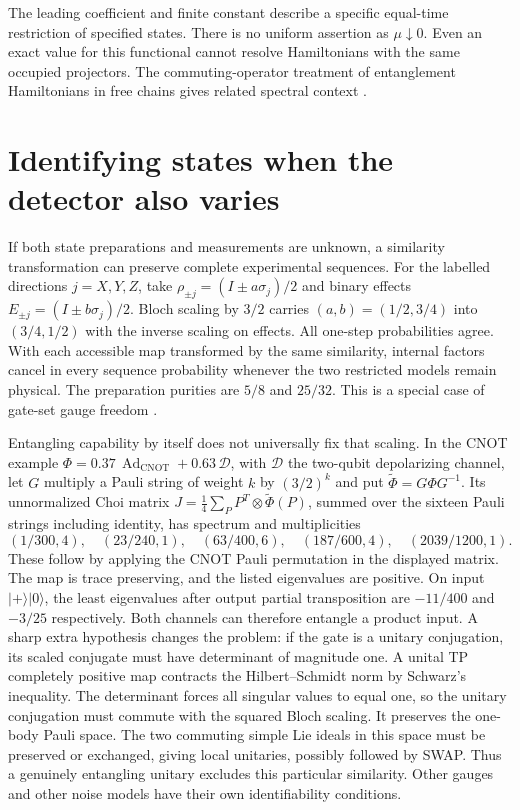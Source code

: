 \documentclass[11pt,letterpaper]{article}
\begin{document}
The leading coefficient and finite constant describe a specific equal-time restriction of specified states. There is no uniform assertion as $\mu\downarrow0$. Even an exact value for this functional cannot resolve Hamiltonians with the same occupied projectors. The commuting-operator treatment of entanglement Hamiltonians in free chains gives related spectral context \cite{eisler}.

\section{Identifying states when the detector also varies}\label{sec:readout}

If both state preparations and measurements are unknown, a similarity transformation can preserve complete experimental sequences. For the labelled directions $j=X,Y,Z$, take $\rho_{\pm j}=(I\pm a\sigma_j)/2$ and binary effects $E_{\pm j}=(I\pm b\sigma_j)/2$. Bloch scaling by $3/2$ carries $(a,b)=(1/2,3/4)$ into $(3/4,1/2)$ with the inverse scaling on effects. All one-step probabilities agree. With each accessible map transformed by the same similarity, internal factors cancel in every sequence probability whenever the two restricted models remain physical. The preparation purities are $5/8$ and $25/32$. This is a special case of gate-set gauge freedom \cite{gst}.

Entangling capability by itself does not universally fix that scaling. In the CNOT example $\Phi=0.37\,\operatorname{Ad}_{\mathrm{CNOT}}+0.63\,\mathcal D$, with $\mathcal D$ the two-qubit depolarizing channel, let $G$ multiply a Pauli string of weight $k$ by $(3/2)^k$ and put $\widetilde\Phi=G\Phi G^{-1}$. Its unnormalized Choi matrix $J=\tfrac14\sum_P P^T\otimes\widetilde\Phi(P)$, summed over the sixteen Pauli strings including identity, has spectrum and multiplicities
\[
 (1/300,4),\quad(23/240,1),\quad(63/400,6),\quad
 (187/600,4),\quad(2039/1200,1).
\]
These follow by applying the CNOT Pauli permutation in the displayed matrix. The map is trace preserving, and the listed eigenvalues are positive. On input $|+\rangle|0\rangle$, the least eigenvalues after output partial transposition are $-11/400$ and $-3/25$ respectively. Both channels can therefore entangle a product input. A sharp extra hypothesis changes the problem: if the gate is a unitary conjugation, its scaled conjugate must have determinant of magnitude one. A unital TP completely positive map contracts the Hilbert–Schmidt norm by Schwarz's inequality. The determinant forces all singular values to equal one, so the unitary conjugation must commute with the squared Bloch scaling. It preserves the one-body Pauli space. The two commuting simple Lie ideals in this space must be preserved or exchanged, giving local unitaries, possibly followed by SWAP. Thus a genuinely entangling unitary excludes this particular similarity. Other gauges and other noise models have their own identifiability conditions.
\end{document}
